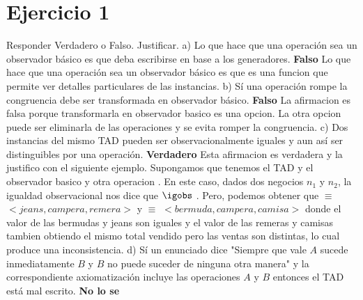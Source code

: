 \documentclass[10pt,a4paper]{article}
\begin{document}
\maketitle

\section{Ejercicio 1}

Responder Verdadero o Falso. Justificar.
\newline
\newline
a) Lo que hace que una operación sea un observador básico es que deba escribirse en base a los generadores. \textbf{Falso}
\newline
\newline
Lo que hace que una operación sea un observador básico es que es una funcion que permite ver detalles particulares de las instancias.
\newline
\newline
b) Sí una operación rompe la congruencia debe ser transformada en observador básico. \textbf{Falso}
\newline
\newline
La afirmacion es falsa porque transformarla en observador basico es una opcion. La otra opcion puede ser eliminarla de las operaciones y se evita romper la congruencia. 
\newline
\newline
c) Dos instancias del mismo TAD pueden ser observacionalmente iguales y aun así ser distinguibles por una operación. \textbf{Verdadero}
\newline
\newline
Esta afirmacion es verdadera y la justifico con el siguiente ejemplo. Supongamos que tenemos el TAD  y el observador basico  y otra operacion .
\newline
\newline
En este caso, dados dos negocios $n_{1}$ y $n_{2}$, la igualdad observacional nos dice que  $\igobs$ .
\newline
\newline 
Pero, podemos obtener que  $\equiv$ $<jeans,campera,remera>$ y  $\equiv$ $<bermuda,campera,camisa>$ donde el valor de las bermudas y jeans son iguales y el valor de las remeras y camisas tambien obtiendo el mismo total vendido pero las ventas son distintas, lo cual produce una inconsistencia.  
\newline
\newline 
d) Sí un enunciado dice "Siempre que vale $A$ sucede inmediatamente $B$ y $B$ no puede suceder de ninguna otra manera" y la correspondiente axiomatización incluye las operaciones $A$ y $B$ entonces el TAD está mal escrito. \textbf{No lo se}
\newpage 
\end{document}
